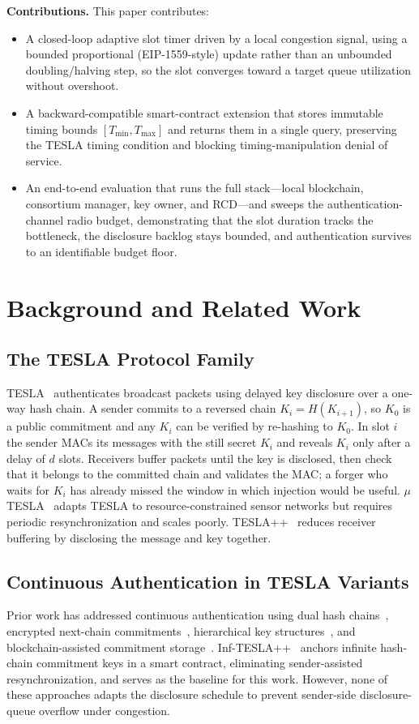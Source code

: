 \documentclass[conference]{IEEEtran}
\begin{document}
\textbf{Contributions.} This paper contributes:
\begin{itemize}
\item A closed-loop adaptive slot timer driven by a local congestion signal,
using a bounded proportional (EIP-1559-style) update rather than an unbounded
doubling/halving step, so the slot converges toward a target queue utilization
without overshoot.
\item A backward-compatible smart-contract extension that stores immutable timing
bounds $[T_{\min},T_{\max}]$ and returns them in a single query, preserving the
TESLA timing condition and blocking timing-manipulation denial of service.
\item An end-to-end evaluation that runs the full stack---local blockchain,
consortium manager, key owner, and RCD---and sweeps the authentication-channel
radio budget, demonstrating that the slot duration tracks the bottleneck, the
disclosure backlog stays bounded, and authentication survives to an identifiable
budget floor.
\end{itemize}

\section{Background and Related Work}

\subsection{The TESLA Protocol Family}
TESLA~\cite{tesla} authenticates broadcast packets using delayed key disclosure
over a one-way hash chain. A sender commits to a reversed chain
$K_i = H(K_{i+1})$, so $K_0$ is a public commitment and any $K_i$ can be verified
by re-hashing to $K_0$. In slot $i$ the sender MACs its messages with the still
secret $K_i$ and reveals $K_i$ only after a delay of $d$ slots. Receivers buffer
packets until the key is disclosed, then check that it belongs to the committed
chain and validates the MAC; a forger who waits for $K_i$ has already missed the
window in which injection would be useful. $\mu$TESLA~\cite{spins} adapts TESLA to
resource-constrained sensor networks but requires periodic resynchronization and
scales poorly. TESLA++~\cite{teslapp} reduces receiver buffering by disclosing the
message and key together.

\subsection{Continuous Authentication in TESLA Variants}
Prior work has addressed continuous authentication using dual hash
chains~\cite{inftesla_orig}, encrypted next-chain commitments~\cite{enhanced},
hierarchical key structures~\cite{empirical,comparative}, and
blockchain-assisted commitment storage~\cite{garcia}. Inf-TESLA++~\cite{inftesla}
anchors infinite hash-chain commitment keys in a smart contract, eliminating
sender-assisted resynchronization, and serves as the baseline for this work.
However, none of these approaches adapts the disclosure schedule to prevent
sender-side disclosure-queue overflow under congestion.
\end{document}
